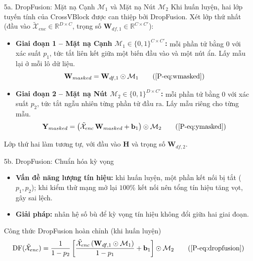 \documentclass [xcolor=svgnames, notes] {beamer}
\newcommand{\R}{\mathbb{R}}
\newcommand{\one}{\mathbf{1}}
\begin{document}
\begin{frame}{5a. DropFusion: Mặt nạ Cạnh $\mathcal{M}_1$ và Mặt nạ Nút $\mathcal{M}_2$}
    Khi huấn luyện, hai lớp tuyến tính của CrossVBlock được can thiệp bởi DropFusion. Xét lớp thứ nhất
    (đầu vào $\tilde{\mathcal{X}}_{enc}\in\R^{D\times C}$, trọng số $\mathbf{W}_{df,1}\in\R^{C\times C'}$):
    \vspace{0.15cm}
    \begin{itemize}
        \item \textbf{Giai đoạn 1 -- Mặt nạ Cạnh $\mathcal{M}_1\in\{0,1\}^{C\times C'}$:} mỗi phần tử bằng 0 với xác
              suất $p_1$, tức tắt liên kết giữa một biến đầu vào và một nút ẩn. Lấy mẫu lại ở mỗi lô dữ liệu.
        \[\mathbf{W}_{masked} = \mathbf{W}_{df,1} \odot \mathcal{M}_1 \tag{\ref*{P-eq:wmasked}}\]

        \item \textbf{Giai đoạn 2 -- Mặt nạ Nút $\mathcal{M}_2\in\{0,1\}^{D\times C'}$:} mỗi phần tử bằng 0 với xác suất
              $p_2$, tức tắt ngẫu nhiên từng phần tử đầu ra. Lấy mẫu riêng cho từng mẫu.
        \[\mathbf{Y}_{masked} = \big(\tilde{\mathcal{X}}_{enc}\,\mathbf{W}_{masked} + \mathbf{b}_1\big) \odot \mathcal{M}_2 \tag{\ref*{P-eq:ymasked}}\]
    \end{itemize}
    \small Lớp thứ hai làm tương tự, với đầu vào $\mathbf{H}$ và trọng số $\mathbf{W}_{df,2}$.
\end{frame}


\begin{frame}{5b. DropFusion: Chuẩn hóa kỳ vọng}
    \begin{itemize}
        \item \textbf{Vấn đề năng lượng tín hiệu:} khi huấn luyện, một phần kết nối bị tắt ($p_1, p_2$); khi kiểm thử mạng mở
              lại $100\%$ kết nối nên tổng tín hiệu tăng vọt, gây sai lệch.
        \item \textbf{Giải pháp:} nhân hệ số bù để kỳ vọng tín hiệu không đổi giữa hai giai đoạn.
    \end{itemize}

    \begin{alertblock}{Công thức DropFusion hoàn chỉnh (khi huấn luyện)}
        \[\text{DF}(\tilde{\mathcal{X}}_{enc}) = \frac{1}{1-p_2}\left[\frac{\tilde{\mathcal{X}}_{enc}\,(\mathbf{W}_{df,1}\odot\mathcal{M}_1)}{1-p_1}
          + \mathbf{b}_1\right]\odot\mathcal{M}_2 \tag{\ref*{P-eq:dropfusion}}\]
    \end{alertblock}

\end{frame}
\end{document}
